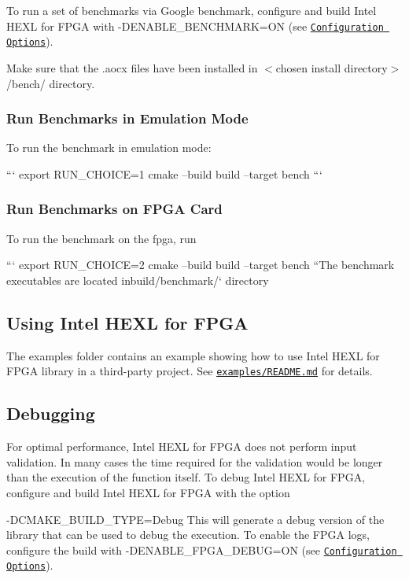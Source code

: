 To run a set of benchmarks via Google benchmark, configure and build Intel H\-E\-X\-L for F\-P\-G\-A with {\ttfamily -\/\-D\-E\-N\-A\-B\-L\-E\-\_\-\-B\-E\-N\-C\-H\-M\-A\-R\-K=O\-N} (see \href{#configuration-options}{\tt Configuration Options}). \par
 Make sure that the .aocx files have been installed in {\ttfamily $<$chosen install directory$>$/bench/} directory. \par


\subsubsection*{Run Benchmarks in Emulation Mode}

To run the benchmark in emulation mode\-: \par
 ``` export R\-U\-N\-\_\-\-C\-H\-O\-I\-C\-E=1 cmake --build build --target bench ``` \subsubsection*{Run Benchmarks on F\-P\-G\-A Card}

To run the benchmark on the fpga, run \par
 ``` export R\-U\-N\-\_\-\-C\-H\-O\-I\-C\-E=2 cmake --build build --target bench ``{\ttfamily  The benchmark executables are located in}build/benchmark/` directory \par


\subsection*{Using Intel H\-E\-X\-L for F\-P\-G\-A}

The {\ttfamily examples} folder contains an example showing how to use Intel H\-E\-X\-L for F\-P\-G\-A library in a third-\/party project. See \href{examples/README.md}{\tt examples/\-R\-E\-A\-D\-M\-E.\-md} for details. \par


\subsection*{Debugging}

For optimal performance, Intel H\-E\-X\-L for F\-P\-G\-A does not perform input validation. In many cases the time required for the validation would be longer than the execution of the function itself. To debug Intel H\-E\-X\-L for F\-P\-G\-A, configure and build Intel H\-E\-X\-L for F\-P\-G\-A with the option \par
 {\ttfamily -\/\-D\-C\-M\-A\-K\-E\-\_\-\-B\-U\-I\-L\-D\-\_\-\-T\-Y\-P\-E=Debug} This will generate a debug version of the library that can be used to debug the execution. To enable the F\-P\-G\-A logs, configure the build with {\ttfamily -\/\-D\-E\-N\-A\-B\-L\-E\-\_\-\-F\-P\-G\-A\-\_\-\-D\-E\-B\-U\-G=O\-N} (see \href{#configuration-options}{\tt Configuration Options}). \par


